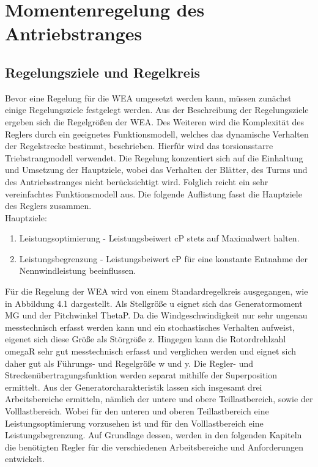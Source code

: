 \section{Momentenregelung des Antriebstranges} \label{regelung}

\subsection{Regelungsziele und Regelkreis}
Bevor eine Regelung für die WEA umgesetzt werden kann, müssen zunächst einige Regelungsziele festgelegt werden. Aus der Beschreibung der Regelungsziele ergeben sich die Regelgrößen der WEA. Des Weiteren wird die Komplexität des Reglers durch ein geeignetes Funktionsmodell, welches das dynamische Verhalten der Regelstrecke bestimmt, beschrieben. Hierfür wird das torsionsstarre Triebstrangmodell verwendet. Die Regelung konzentiert sich auf die Einhaltung und Umsetzung der Hauptziele, wobei das Verhalten der Blätter, des Turms und des Antriebsstranges nicht berücksichtigt wird. Folglich reicht ein sehr vereinfachtes Funktionsmodell aus. Die folgende Auflistung fasst die Hauptziele des Reglers zusammen.
\\

Hauptziele:
\begin{enumerate}
    \item Leistungsoptimierung - Leistungsbeiwert \acs{cP} stets auf Maximalwert halten.
    \item Leistungsbegrenzung - Leistungsbeiwert \acs{cP} für eine konstante Entnahme der Nennwindleistung beeinflussen.
\end{enumerate}



Für die Regelung der WEA wird von einem Standardregelkreis ausgegangen, wie in Abbildung 4.1 dargestellt. Als Stellgröße u eignet sich das Generatormoment \acs{MG} und der Pitchwinkel \acs{ThetaP}. Da die Windgeschwindigkeit nur sehr ungenau messtechnisch erfasst werden kann und ein stochastisches Verhalten aufweist, eigenet sich diese Größe als Störgröße z. Hingegen kann die Rotordrehlzahl \acs{omegaR} sehr gut messtechnisch erfasst und verglichen werden und eignet sich daher gut als Führungs- und Regelgröße w und y. Die Regler- und Streckenübertragungsfunktion werden separat mithilfe der Superposition ermittelt. Aus der Generatorcharakteristik lassen sich insgesamt drei Arbeitsbereiche ermitteln, nämlich der untere und obere Teillastbereich, sowie der Volllastbereich. Wobei für den unteren und oberen Teillastbereich eine Leistungsoptimierung vorzusehen ist und für den Volllastbereich eine Leistungsbegrenzung. Auf Grundlage dessen, werden in den folgenden Kapiteln die benötigten Regler für die verschiedenen Arbeitsbereiche und Anforderungen entwickelt. 

